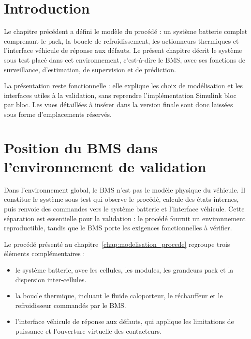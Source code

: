 \label{chap:modelisation_sut}

\section{Introduction}
\label{sec:ch4_introduction}

Le chapitre précédent a défini le modèle du procédé : un système batterie complet comprenant le pack, la boucle de refroidissement, les actionneurs thermiques et l'interface véhicule de réponse aux défauts. Le présent chapitre décrit le système sous test placé dans cet environnement, c'est-à-dire le BMS, avec ses fonctions de surveillance, d'estimation, de supervision et de prédiction.

\noindent
La présentation reste fonctionnelle : elle explique les choix de modélisation et les interfaces utiles à la validation, sans reprendre l'implémentation Simulink bloc par bloc. Les vues détaillées à insérer dans la version finale sont donc laissées sous forme d'emplacements réservés.

\section{Position du BMS dans l'environnement de validation}
\label{sec:ch4_position_bms}

Dans l'environnement global, le BMS n'est pas le modèle physique du véhicule. Il constitue le système sous test qui observe le procédé, calcule des états internes, puis renvoie des commandes vers le système batterie et l'interface véhicule. Cette séparation est essentielle pour la validation : le procédé fournit un environnement reproductible, tandis que le BMS porte les exigences fonctionnelles à vérifier.

\noindent
Le procédé présenté au chapitre~\ref{chap:modelisation_procede} regroupe trois éléments complémentaires :
\begin{itemize}
  \item le système batterie, avec les cellules, les modules, les grandeurs pack et la dispersion inter-cellules.
  \item la boucle thermique, incluant le fluide caloporteur, le réchauffeur et le refroidisseur commandés par le BMS.
  \item l'interface véhicule de réponse aux défauts, qui applique les limitations de puissance et l'ouverture virtuelle des contacteurs.
\end{itemize}

